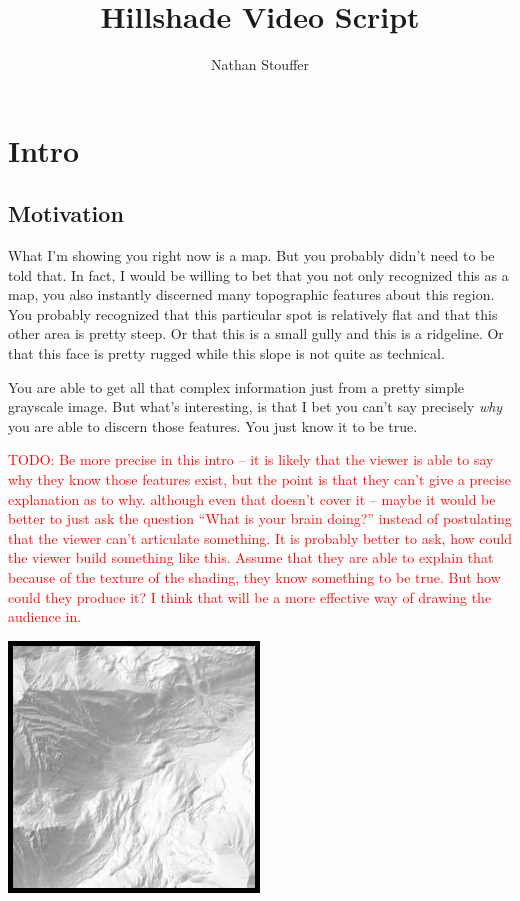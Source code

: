 \documentclass{article}
\newcommand\todo[1]{\textcolor{red}{TODO: #1}}
\begin{document}
	
\title{Hillshade Video Script}
\author{Nathan Stouffer}
\date{}
\maketitle

\section{Intro}

\subsection{Motivation}

What I'm showing you right now is a map.
But you probably didn't need to be told that.
In fact, I would be willing to bet that you not only recognized this as a map, you also instantly discerned many topographic features about this region.
You probably recognized that this particular spot is relatively flat and that this other area is pretty steep.
Or that this is a small gully and this is a ridgeline.
Or that this face is pretty rugged while this slope is not quite as technical.

You are able to get all that complex information just from a pretty simple grayscale image.
But what's interesting, is that I bet you can't say precisely \textit{why} you are able to discern those features.
You just know it to be true.

\todo{Be more precise in this intro -- it is likely that the viewer is able to say why they know those features exist, but the point is that they can't give a precise explanation as to why. although even that doesn't cover it -- maybe it would be better to just ask the question ``What is your brain doing?'' instead of postulating that the viewer can't articulate something. It is probably better to ask, how could the viewer build something like this. Assume that they are able to explain that because of the texture of the shading, they know something to be true. But how could they produce it? I think that will be a more effective way of drawing the audience in.}

\begin{center}
	\includegraphics[width=0.5\textwidth]{assets/hillshade-example.png}
\end{center}
\end{document}
